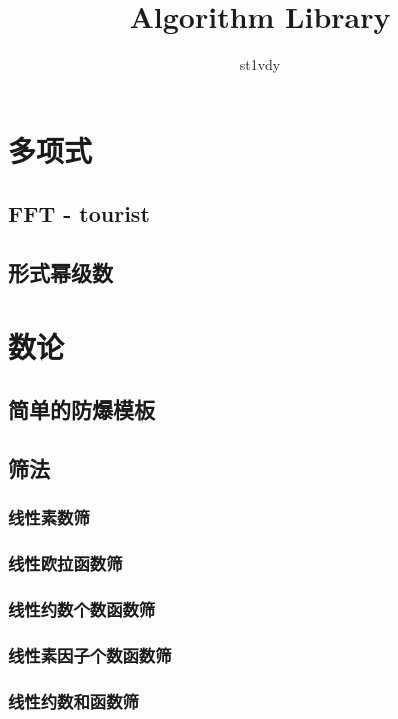 \documentclass{article}
\title{Algorithm Library}
\author{st1vdy}
\begin{document}
\begin{titlepage}
\maketitle
\thispagestyle{empty}
\pagebreak
\pagestyle{plain}
\tableofcontents
\end{titlepage}
\newpage %
\section{多项式} %
\subsection{FFT - tourist}

\subsection{形式幂级数}

\section{数论}
\subsection{简单的防爆模板}

\subsection{筛法}
\subsubsection{线性素数筛}

\subsubsection{线性欧拉函数筛}

\subsubsection{线性约数个数函数筛}

\subsubsection{线性素因子个数函数筛}

\subsubsection{线性约数和函数筛}

\end{document}
